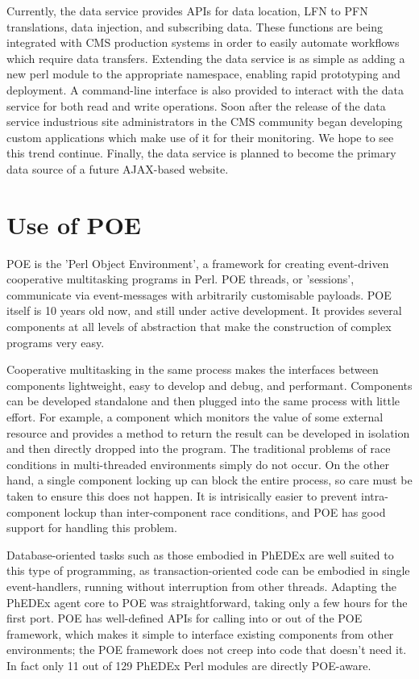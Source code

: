 \documentclass{PoS}
\begin{document}
Currently, the data service provides APIs for data location, LFN to
PFN translations, data injection, and subscribing data.  These
functions are being integrated with CMS production systems in order to
easily automate workflows which require data transfers.  Extending the
data service is as simple as adding a new perl module to the
appropriate namespace, enabling rapid prototyping and deployment.  A
command-line interface is also provided to interact with the data
service for both read and write operations.  Soon after the release of
the data service industrious site administrators in the CMS community
began developing custom applications which make use of it for their
monitoring.  We hope to see this trend continue.  Finally, the data
service is planned to become the primary data source of a future
AJAX-based website.

\section{Use of POE}


POE is the 'Perl Object Environment', a framework for creating
event-driven cooperative multitasking programs in Perl. POE threads,
or 'sessions', communicate via event-messages with arbitrarily
customisable payloads. POE itself is 10 years old now, and still under
active development. It provides several components at all levels of
abstraction that make the construction of complex programs very easy.

Cooperative multitasking in the same process makes the interfaces
between components lightweight, easy to develop and debug, and
performant. Components can be developed standalone and then plugged
into the same process with little effort. For example, a component
which monitors the value of some external resource and provides a
method to return the result can be developed in isolation and then
directly dropped into the program. The traditional problems of race
conditions in multi-threaded environments simply do not occur. On the
other hand, a single component locking up can block the entire
process, so care must be taken to ensure this does not happen. It is
intrisically easier to prevent intra-component lockup than
inter-component race conditions, and POE has good support for handling
this problem.

Database-oriented tasks such as those embodied in PhEDEx are well
suited to this type of programming, as transaction-oriented code can
be embodied in single event-handlers, running without interruption
from other threads. Adapting the PhEDEx agent core to POE was
straightforward, taking only a few hours for the first port. POE has
well-defined APIs for calling into or out of the POE framework, which
makes it simple to interface existing components from other
environments; the POE framework does not creep into code that doesn't
need it. In fact only 11 out of 129 PhEDEx Perl modules are directly
POE-aware.
\end{document}
